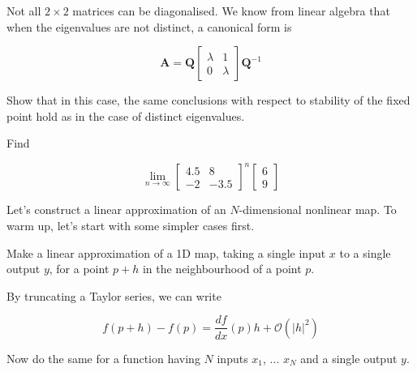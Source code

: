 \pagebreak

\begin{exer}
  Not all $2 \times 2$ matrices can be diagonalised. We know from linear algebra that when the eigenvalues are not distinct, a canonical form is
  
\begin{equation}
{\mathbf A} = 
{\mathbf Q}
\begin{bmatrix}
\lambda & 1 \\
0 & \lambda
\end{bmatrix} 
{\mathbf Q}^{-1}
\end{equation} 

Show that in this case, the same conclusions with respect to stability of the fixed point hold as in the case of distinct eigenvalues.
\end{exer}


\begin{exer}
Find

$$\lim_{n \to \infty}\begin{bmatrix}4.5 & 8 \\ -2 & -3.5 \end{bmatrix} ^ n \begin{bmatrix} 6 \\ 9 \end{bmatrix}$$

\end{exer}


\pagebreak


Let's construct a linear approximation of an $N$-dimensional nonlinear map. To warm up, let's start with some simpler cases first.

\begin{cue}
Make a linear approximation of a 1D map, taking a single input $x$ to a single output $y$, for a point $p+h$ in the neighbourhood of a point $p$.  
\end{cue}

By truncating a Taylor series, we can write

\begin{equation}
f(p+h) - f(p) = \frac{df}{dx}(p)h + \mathcal{O}\left(|h|^2\right)
\end{equation} 

\begin{cue}
Now do the same for a function having $N$ inputs $x_1$, ... $x_N$ and a single output $y$.  
\end{cue}

